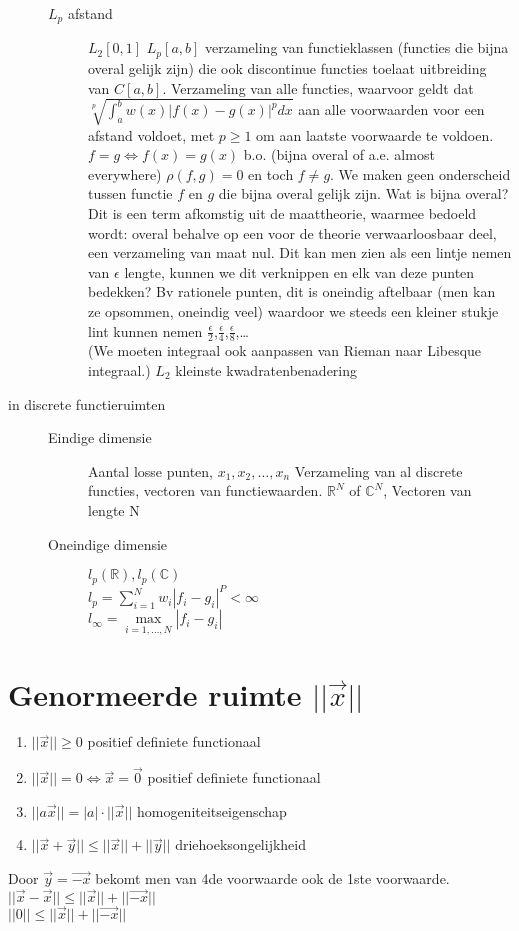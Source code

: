 \begin{description}
\begin{description}
\item[$L_p$ afstand] 
\begin{exam}$L_2[0, 1]$
$L_p[a,b]$ verzameling van functieklassen (functies die bijna overal gelijk zijn) die ook discontinue functies toelaat uitbreiding van $C[a,b]$. Verzameling van alle functies, waarvoor geldt dat $\sqrt[p]{\int_a^b w(x)|f(x)-g(x)|^p dx}$ aan alle voorwaarden voor een afstand voldoet, met $p \geq 1$ om aan laatste voorwaarde te voldoen. \\
$f=g \iff f(x)=g(x)$ b.o. (bijna overal of a.e. almost everywhere)
$\rho(f,g)=0$ en toch $f\neq g$. We maken geen onderscheid tussen functie $f$ en $g$ die bijna overal gelijk zijn. Wat is bijna overal? Dit is een term afkomstig uit de maattheorie, waarmee bedoeld wordt: overal behalve op een voor de theorie verwaarloosbaar deel, een verzameling van maat nul. Dit kan men zien als een lintje nemen van $\epsilon$ lengte, kunnen we dit verknippen en elk van deze punten bedekken? Bv rationele punten, dit is oneindig aftelbaar (men kan ze opsommen, oneindig veel) waardoor we steeds een kleiner stukje lint kunnen nemen $\frac{\epsilon}{2}$,$\frac{\epsilon}{4}$,$\frac{\epsilon}{8}$,\ldots\\ (We moeten integraal ook aanpassen van Rieman naar Libesque integraal.)
\textbf{$L_2$} kleinste kwadratenbenadering %
\end{exam}
\end{description}
\item[in discrete functieruimten] 
\begin{description}
\item[Eindige dimensie] Aantal losse punten, $x_1,x_2,\ldots,x_n$ Verzameling van al discrete functies, vectoren van functiewaarden. $\mathbb{R}^N$ of $\mathbb{C}^N$, Vectoren van lengte N
\item[Oneindige dimensie] $l_p(\mathbb{R}), l_p(\mathbb{C})$ \\
$l_p = \sum_{i=1}^N w_i |f_i-g_i |^P < \infty $ \\
$l_\infty = \underset{i=1,\ldots,N}{\operatorname{max}} |f_i-g_i|$
\end{description} 
\end{description}

\section{Genormeerde ruimte $||\vec{x}||$}
\begin{enumerate}
\item $||\vec{x}|| \geq 0 $ positief definiete functionaal
\item $||\vec{x}|| = 0  \iff \vec{x} = \vec{0} $ positief definiete functionaal
\item $||a \vec{x}|| = |a| \cdot ||\vec{x}|| $ homogeniteitseigenschap
\item $||\vec{x}+\vec{y}|| \leq ||\vec{x}|| + ||\vec{y}|| $ driehoeksongelijkheid
\end{enumerate}
Door $\vec{y} = \vec{-x}$ bekomt men van 4de voorwaarde ook de 1ste voorwaarde. $||\vec{x}-\vec{x}|| \leq ||\vec{x}|| + ||\vec{-x}|| $ \\
$||0|| \leq ||\vec{x}|| + ||\vec{-x}|| $

